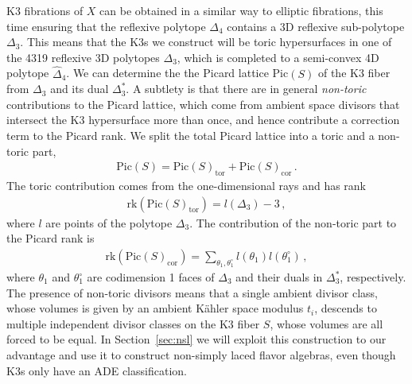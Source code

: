 \documentclass[11pt]{article}
\numberwithin{equation}{section}
\newcommand{\rk}{\text{rk}}
\newcommand{\Pic}{\text{Pic}}
\begin{document}
K3 fibrations of $X$ can be obtained in a similar way to elliptic fibrations, this time ensuring that the reflexive polytope $\Delta_{4}$ contains a 3D reflexive sub-polytope $\Delta_{3}$. This means that the K3s we construct will be toric hypersurfaces in one of the 4319 reflexive 3D polytopes $\Delta_3$, which is completed to a semi-convex 4D polytope $\hat{\Delta}_4$. We can determine the the Picard lattice Pic$(S)$ of the K3 fiber from $\Delta_3$ and its dual $\Delta_3^{*}$. A subtlety is that there are in general \textit{non-toric} contributions to the Picard lattice, which come from ambient space divisors that intersect the K3 hypersurface more than once, and hence contribute a correction term to the Picard rank. We split the total Picard lattice into a toric and a non-toric part, 
\begin{align}
    \Pic(S)=\Pic(S)_\text{tor} + \Pic(S)_\text{cor}\,. 
\end{align}
The toric contribution comes from the one-dimensional rays and has rank
\begin{align}
\label{eq:Pictoric}
    \rk(\Pic(S)_\text{tor})= l(\Delta_3)-3\,,
\end{align}
where $l$ are points of the polytope $\Delta_3$. The contribution of the non-toric part to the Picard rank is
\begin{align}
\label{eq:Picnontoric}
\rk(\Pic(S)_\text{cor})=\sum_{\theta_1, \theta_1^\circ} l(\theta_1)l(\theta^{\circ}_1) \, ,
\end{align}
where $\theta_1$ and $\theta^\circ_1$ are codimension 1 faces of $\Delta_3$ and their duals in $\Delta_3^{*}$, respectively. The presence of non-toric divisors means that a single ambient divisor class, whose volumes is given by an ambient K\"ahler space modulus $t_i$, descends to multiple independent divisor classes on the K3 fiber $S$, whose volumes are all forced to be equal. In Section~\ref{sec:nsl}
we will exploit this construction to our advantage and use it to construct non-simply laced flavor algebras, even though K3s only have an ADE classification. 


\end{document}
